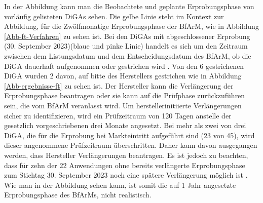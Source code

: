 \documentclass{article}
\begin{document}
			In der Abbildung kann man die Beobachtete und geplante Erprobungsphase von vorläufig gelisteten DiGAs sehen. Die gelbe Linie steht im Kontext zur Abbildung, für die  Zwölfmonatige Erprobungsphase der BfArM, wie in Abbildung \ref{Abb-ft-Verfahren} zu sehen ist. Bei den DiGAs mit abgeschlossener Erprobung (30. September 2023)(blaue und pinke Linie) handelt es sich um den Zeitraum zwischen dem Listungsdatum und dem Entscheidungsdatum des BfArM, ob die DiGA dauerhaft aufgenommen oder gestrichen wird \cite[vgl. S.10]{TK-Report-2}. Von den 6 gestrichenen DiGA wurden 2 davon, auf bitte des Herstellers gestrichen wie in Abbildung \ref{Abb-ergebnisse-ft} zu sehen ist. Der Hersteller kann die Verlängerung der Erprobungsphase beantragen oder sie kann auf die Prüfphase zurückzuführen sein, die vom BfArM veranlasst wird. Um herstellerinitiierte Verlängerungen sicher zu identifizieren, wird ein Prüfzeitraum von 120 Tagen anstelle der gesetzlich vorgeschriebenen drei Monate angesetzt. Bei mehr als zwei von drei DiGA, die für die Erprobung bei Markteintritt aufgeführt sind (23 von 45), wird dieser angenommene Prüfzeitraum überschritten. Daher kann davon ausgegangen werden, dass Hersteller Verlängerungen beantragen. Es ist jedoch zu beachten, dass für zehn der 22 Anwendungen ohne bereits verlängerte Erprobungsphase zum Stichtag 30. September 2023 noch eine spätere Verlängerung möglich ist \cite[vgl S. 10]{TK-Report-2}. Wie man in der Abbildung sehen kann, ist somit die auf 1 Jahr angesetzte Erprobungsphase des BfArMs, nicht realistisch.
\end{document}
